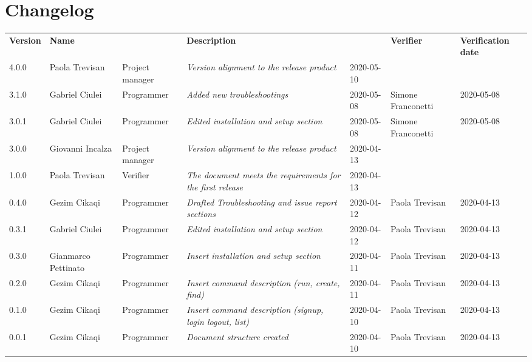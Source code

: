 \section*{Changelog}
\renewcommand{\arraystretch}{1.8}
  \setlength\LTleft{-1.7cm}
  \begin{longtable}{|p{1.7cm}|p{2cm}|p{2.5cm}|p{3cm}|p{1.7cm}|p{2cm}|p{2.3cm}|}
    \hline
    \rowcolor{header}
    \textbf{Version} & \textbf{Name} & \centering{\textbf{Role}} & \textbf{Description} &      \centering{\textbf{Date}} & \textbf{Verifier} & \textbf{Verification date} \\
    4.0.0 & Paola Trevisan & Project manager & \small{\textit{Version alignment to the release product}} & 2020-05-10 & & \\
    
    3.1.0 & Gabriel Ciulei  & Programmer & \small{\textit{Added new troubleshootings}} & 2020-05-08 & Simone Franconetti & 2020-05-08 \\
    
    3.0.1 & Gabriel Ciulei  & Programmer & \small{\textit{Edited installation and setup section}} & 2020-05-08 & Simone Franconetti & 2020-05-08 \\
    
    3.0.0 & Giovanni Incalza & Project manager & \small{\textit{Version alignment to the release product}} & 2020-04-13 & & \\
    
    1.0.0 & Paola Trevisan & Verifier & \small{\textit{The document meets the requirements for the first release}} & 2020-04-13 & & \\
    
    0.4.0 & Gezim Cikaqi & Programmer & \small{\textit{Drafted Troubleshooting and issue report sections}} & 2020-04-12 & Paola Trevisan & 2020-04-13 \\
    
    0.3.1 & Gabriel Ciulei  & Programmer & \small{\textit{Edited installation and setup section}} & 2020-04-12 & Paola Trevisan & 2020-04-13 \\
    
    0.3.0 & Gianmarco Pettinato  & Programmer & \small{\textit{Insert installation and setup section}} & 2020-04-11 & Paola Trevisan & 2020-04-13 \\
    
    0.2.0 & Gezim Cikaqi  & Programmer & \small{\textit{Insert command description (run, create, find)}} & 2020-04-11 & Paola Trevisan & 2020-04-13 \\
    
	0.1.0 & Gezim Cikaqi  & Programmer & \small{\textit{Insert command description (signup, login logout, list)}} & 2020-04-10 & Paola Trevisan & 2020-04-13 \\
    
    0.0.1 & Gezim Cikaqi  & Programmer & \small{\textit{Document structure created}} & 2020-04-10 & Paola Trevisan & 2020-04-13\\

    \hline
  \end{longtable}
\setlength\LTleft{0cm}
\restoregeometry
